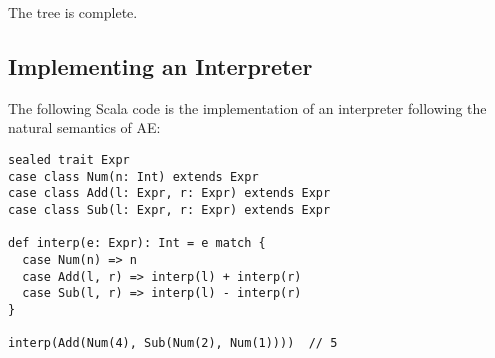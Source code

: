 The tree is complete.

\subsection{Implementing an Interpreter}

The following Scala code is the implementation of an interpreter following the
natural semantics of AE:

\begin{verbatim}
sealed trait Expr
case class Num(n: Int) extends Expr
case class Add(l: Expr, r: Expr) extends Expr
case class Sub(l: Expr, r: Expr) extends Expr

def interp(e: Expr): Int = e match {
  case Num(n) => n
  case Add(l, r) => interp(l) + interp(r)
  case Sub(l, r) => interp(l) - interp(r)
}

interp(Add(Num(4), Sub(Num(2), Num(1))))  // 5
\end{verbatim}
